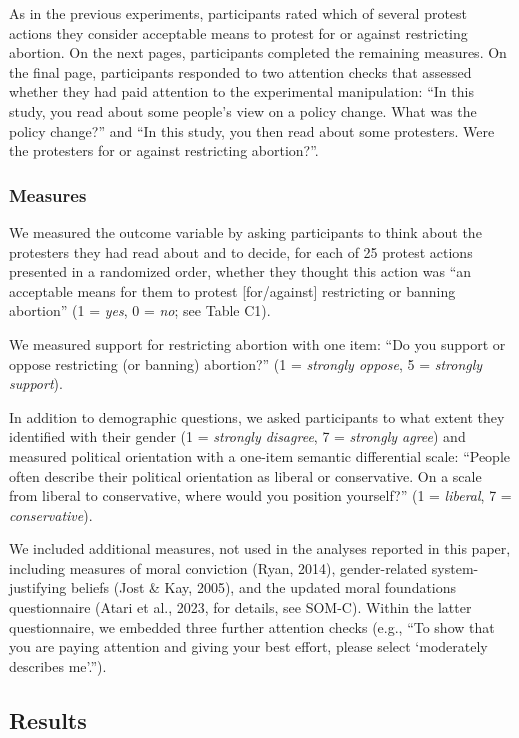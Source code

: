 \documentclass[12pt, letterpaper]{article}
\begin{document}
\noindent As in the previous experiments, participants rated which of
several protest actions they consider acceptable means to protest for or
against restricting abortion. On the next pages, participants completed
the remaining measures. On the final page, participants responded to two
attention checks that assessed whether they had paid attention to the
experimental manipulation: ``In this study, you read about some people's
view on a policy change. What was the policy change?'' and ``In this
study, you then read about some protesters. Were the protesters for or
against restricting abortion?''.

\hypertarget{measures-2}{%
\subsubsection{Measures}\label{measures-2}}

We measured the outcome variable by asking participants to think about
the protesters they had read about and to decide, for each of 25 protest
actions presented in a randomized order, whether they thought this
action was ``an acceptable means for them to protest {[}for/against{]}
restricting or banning abortion'' (1 = \emph{yes}, 0 = \emph{no}; see
Table C1).

We measured support for restricting abortion with one item: ``Do you
support or oppose restricting (or banning) abortion?'' (1 =
\emph{strongly oppose}, 5 = \emph{strongly support}).

In addition to demographic questions, we asked participants to what
extent they identified with their gender (1 = \emph{strongly disagree},
7 = \emph{strongly agree}) and measured political orientation with a
one-item semantic differential scale: ``People often describe their
political orientation as liberal or conservative. On a scale from
liberal to conservative, where would you position yourself?'' (1 =
\emph{liberal}, 7 = \emph{conservative}).

We included additional measures, not used in the analyses reported in
this paper, including measures of moral conviction (Ryan, 2014),
gender-related system-justifying beliefs (Jost \& Kay, 2005), and the
updated moral foundations questionnaire (Atari et al., 2023, for
details, see SOM-C). Within the latter questionnaire, we embedded three
further attention checks (e.g., ``To show that you are paying attention
and giving your best effort, please select `moderately describes
me'.'').

\hypertarget{results-2}{%
\subsection{Results}\label{results-2}}
\end{document}
